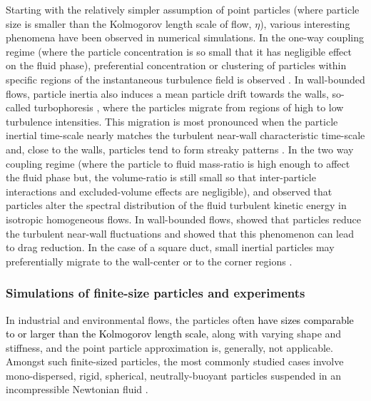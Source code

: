 \documentclass{jfm}
\def\sz#1{{\textcolor{black}{#1}}}
\begin{document}
Starting with the relatively simpler assumption of point particles (where particle size is smaller than the Kolmogorov length scale of flow, $\eta$), various interesting phenomena have been observed in numerical simulations. In the one-way coupling regime (where the particle concentration is so small that it has negligible effect on the fluid phase), preferential concentration or clustering of particles within specific regions of the instantaneous turbulence field is observed \citep{eaton1994preferential}. In wall-bounded flows, particle inertia also induces a mean particle drift towards the walls, so-called turbophoresis \citep{reeks1983transport}, where the particles migrate from regions of high to low turbulence intensities. This migration is most pronounced when the particle inertial time-scale nearly matches the turbulent near-wall characteristic time-scale \citep{soldati2009physics} and, close to the walls, particles tend to form streaky patterns \citep{sardina2012wall}. 
In the two way coupling regime (where the particle to fluid mass-ratio is high enough to affect the fluid phase but, the volume-ratio is still small so that inter-particle interactions and excluded-volume effects are negligible), \citet{squires1990particle} and \citet{elghobashi1993two} observed that particles alter the spectral distribution of the fluid turbulent kinetic energy in isotropic homogeneous flows. In wall-bounded flows, \citet{kulick1994particle} showed that particles reduce the turbulent near-wall fluctuations and \citet{zhao2010turbulence} showed that this phenomenon can lead to drag reduction. In the case of a square duct, small inertial 
particles may preferentially migrate to the wall-center or to the corner regions \citep{winkler2004preferential,sharma2006turbulent, yao2014numerical,noorani2016aspect}.

\subsubsection{Simulations of finite-size particles and experiments}\label{subsec:Simulations of finite-size particles and experiments}

In industrial and environmental flows, the particles often \sz{have sizes comparable to or larger than the Kolmogorov length scale,} along with varying shape and stiffness, and the point particle approximation is, generally, not applicable. Amongst such finite-sized particles, the most commonly studied cases involve mono-dispersed, rigid, spherical, neutrally-buoyant particles suspended in an incompressible Newtonian fluid \citep{picano2015turbulent,lashgari2016channel,fornari2016rheology,ardekani2017drag}.
\end{document}
